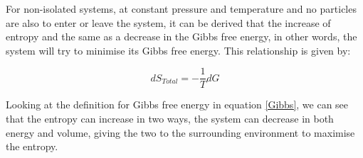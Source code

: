 \documentclass[../hand-in3.tex]{subfiles}
\begin{document}
For non-isolated systems, at constant pressure and temperature and no particles are also to enter or leave the system, it can be derived that the increase of entropy and the same as a decrease in the Gibbs free energy, in other words, the system will try to minimise its Gibbs free energy. This relationship is given by:

\begin{equation}
dS_{Total} = - \frac{1}{T} dG
\end{equation}

Looking at the definition for Gibbs free energy in equation \ref{Gibbs}, we can see that the entropy can increase in two ways, the system can decrease in both energy and volume, giving the two to the surrounding environment to maximise the entropy.   
\end{document}
